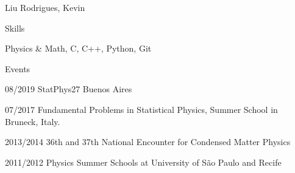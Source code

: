 \documentclass[12pt,a4paper]{article}
\begin{document}
\begin{cv}{Liu Rodrigues, Kevin}
  \begin{cvlist}{Skills}
  \item[] Physics & Math, C, C++, Python, Git
  \end{cvlist}

  \begin{cvlist}{Events}
  \item[08/2019] StatPhys27 Buenos Aires
  \item[07/2017] Fundamental Problems in Statistical Physics, Summer School in Bruneck, Italy.
  \item[2013/2014] 36th and 37th National Encounter for Condensed Matter Physics 
  \item[2011/2012] Physics Summer Schools at University of São Paulo and Recife
  \end{cvlist}

\end{cv}
\end{document}
